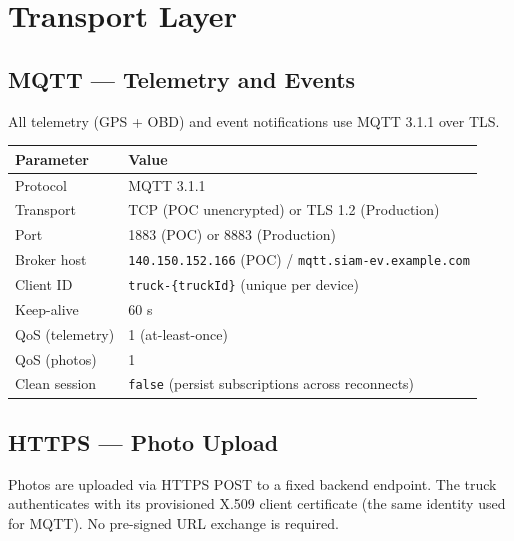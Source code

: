 \documentclass{article}
\begin{document}
\section{Transport Layer}

\subsection{MQTT --- Telemetry and Events}

All telemetry (GPS + OBD) and event notifications use MQTT 3.1.1 over TLS.

\begin{center}
\begin{tabular}{ll}
\toprule
\textbf{Parameter} & \textbf{Value}\\
\midrule
Protocol        & MQTT 3.1.1\\
Transport       & TCP (POC unencrypted) or TLS 1.2 (Production)\\
Port            & 1883 (POC) or 8883 (Production)\\
Broker host     & \texttt{140.150.152.166} (POC) / \texttt{mqtt.siam-ev.example.com}\\
Client ID       & \texttt{truck-\{truckId\}} (unique per device)\\
Keep-alive      & 60 s\\
QoS (telemetry) & 1 (at-least-once)\\
QoS (photos)    & 1\\
Clean session   & \texttt{false} (persist subscriptions across reconnects)\\
\bottomrule
\end{tabular}
\end{center}

\subsection{HTTPS --- Photo Upload}

Photos are uploaded via HTTPS POST to a fixed backend endpoint.
The truck authenticates with its provisioned X.509 client certificate
(the same identity used for MQTT). No pre-signed URL exchange is required.
\end{document}
